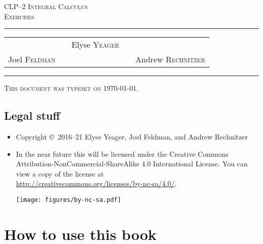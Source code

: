 \documentclass[12pt,letterpaper, openany]{book}
\begin{document}
\setcounter{page}{0}


\begin{titlepage}
\begin{center}
\textsc{\LARGE
CLP--2 Integral Calculus \\[2ex]
Exercises
}\\[2ex]

\vspace{5ex}
\hrule
\vspace{5ex}

\begin{tabular}{lcccr}
&& \large Elyse \textsc{Yeager} \\[3ex]
 Joel \textsc{Feldman}
&\quad & &\quad&
Andrew \textsc{Rechnitzer}
\end{tabular}

\end{center}
\vspace{2ex}
\hrule

\vfill
\textsc{This document was typeset on \today.}
\end{titlepage}

\section*{Legal stuff}
\begin{itemize}
 \item Copyright \copyright\ 2016--21 Elyse Yeager,  Joel Feldman,
and Andrew  Rechnitzer

\item In the near future this will be licensed under the
Creative Commons Attribution-NonCommercial-ShareAlike 4.0 International
License. You can view a copy of the license at \\
\url{http://creativecommons.org/licenses/by-nc-sa/4.0/}.
\begin{center}
 \texttt{[image: figures/by-nc-sa.pdf]}
\end{center}
\end{itemize}

\newpage

\frontmatter

\chapter{How to use this book}


\tableofcontents
\end{document}

